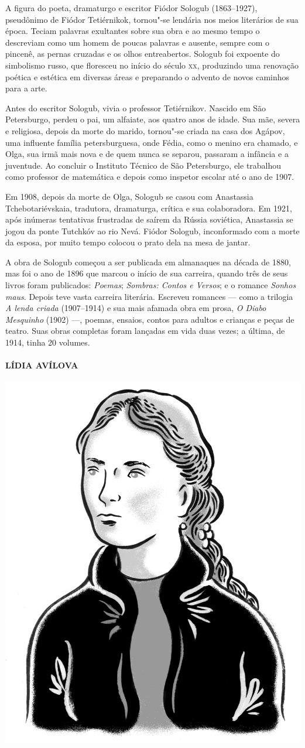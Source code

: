 \noindent{}A figura do poeta, dramaturgo e escritor Fiódor Sologub (1863--1927),
pseudônimo de Fiódor Tetiérnikok, tornou"-se lendária nos meios
literários de sua época. Teciam palavras exultantes sobre sua obra e ao
mesmo tempo o descreviam como um homem de poucas palavras e ausente,
sempre com o pincenê, as pernas cruzadas e os olhos entreabertos.
Sologub foi expoente do simbolismo russo, que floresceu no início do
século \textsc{xx}, produzindo uma renovação poética e estética em diversas áreas
e preparando o advento de novos caminhos para a arte.

Antes do escritor Sologub, vivia o professor Tetiérnikov. Nascido em São
Petersburgo, perdeu o pai, um alfaiate, aos quatro anos de idade. Sua
mãe, severa e religiosa, depois da morte do marido, tornou"-se criada na
casa dos Agápov, uma influente família petersburguesa, onde Fédia, como
o menino era chamado, e Olga, sua irmã mais nova e de quem nunca se
separou, passaram a infância e a juventude. Ao concluir o Instituto
Técnico de São Petersburgo, ele trabalhou como professor de matemática e
depois como inspetor escolar até o ano de 1907.

Em 1908, depois da morte de Olga, Sologub se casou com Anastassia
Tchebotariévskaia, tradutora, dramaturga, crítica e sua colaboradora. Em
1921, após inúmeras tentativas frustradas de saírem da Rússia soviética,
Anastassia se jogou da ponte Tutchkóv ao rio Nevá. Fiódor Sologub,
inconformado com a morte da esposa, por muito tempo colocou o prato dela
na mesa de jantar.

A obra de Sologub começou a ser publicada em almanaques na década de
1880, mas foi o ano de 1896 que marcou o início de sua carreira, quando
três de seus livros foram publicados: \emph{Poemas}; \emph{Sombras:
Contos e Versos}; e o romance \emph{Sonhos maus}. Depois teve vasta
carreira literária. Escreveu romances --- como a trilogia \emph{A lenda
criada} (1907--1914) e sua mais afamada obra em
prosa, \emph{O Diabo Mesquinho} (1902) ---, poemas,
ensaios, contos para adultos e crianças e peças de teatro. Suas obras
completas foram lançadas em vida duas vezes; a última, de 1914, tinha 20
volumes.

\paragraph{LÍDIA AVÍLOVA}

\noindent\includegraphics[width=.8in]{./imgs/autor8.jpg}

